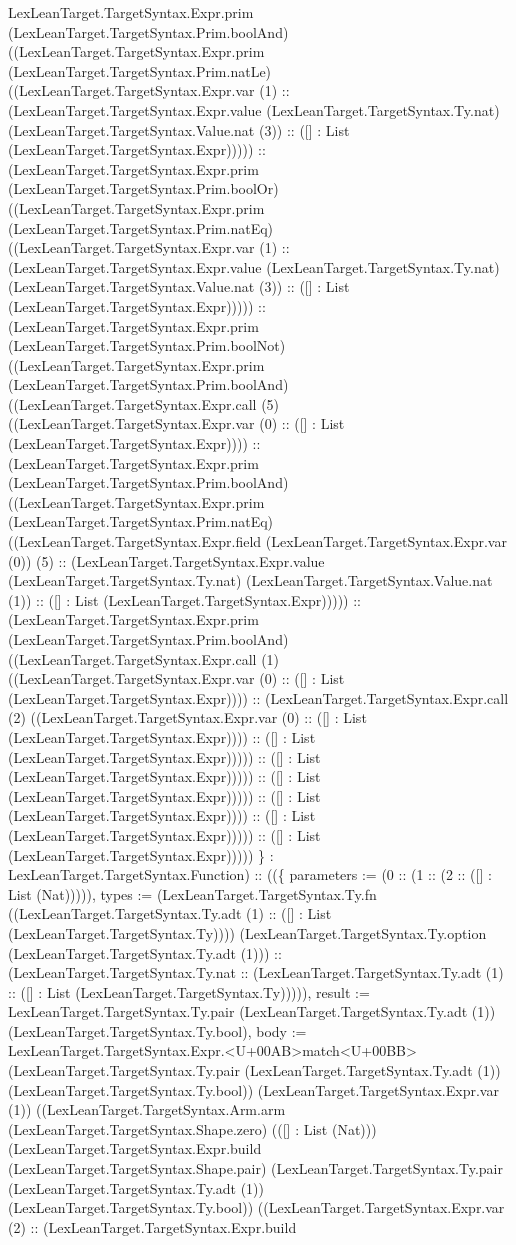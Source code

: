 \documentclass[11pt]{article}
\begin{document}
LexLeanTarget.TargetSyntax.Expr.prim (LexLeanTarget.TargetSyntax.Prim.boolAnd) ((LexLeanTarget.TargetSyntax.Expr.prim (LexLeanTarget.TargetSyntax.Prim.natLe) ((LexLeanTarget.TargetSyntax.Expr.var (1) :: (LexLeanTarget.TargetSyntax.Expr.value (LexLeanTarget.TargetSyntax.Ty.nat) (LexLeanTarget.TargetSyntax.Value.nat (3)) :: ([] : List (LexLeanTarget.TargetSyntax.Expr))))) :: (LexLeanTarget.TargetSyntax.Expr.prim (LexLeanTarget.TargetSyntax.Prim.boolOr) ((LexLeanTarget.TargetSyntax.Expr.prim (LexLeanTarget.TargetSyntax.Prim.natEq) ((LexLeanTarget.TargetSyntax.Expr.var (1) :: (LexLeanTarget.TargetSyntax.Expr.value (LexLeanTarget.TargetSyntax.Ty.nat) (LexLeanTarget.TargetSyntax.Value.nat (3)) :: ([] : List (LexLeanTarget.TargetSyntax.Expr))))) :: (LexLeanTarget.TargetSyntax.Expr.prim (LexLeanTarget.TargetSyntax.Prim.boolNot) ((LexLeanTarget.TargetSyntax.Expr.prim (LexLeanTarget.TargetSyntax.Prim.boolAnd) ((LexLeanTarget.TargetSyntax.Expr.call (5) ((LexLeanTarget.TargetSyntax.Expr.var (0) :: ([] : List (LexLeanTarget.TargetSyntax.Expr)))) :: (LexLeanTarget.TargetSyntax.Expr.prim (LexLeanTarget.TargetSyntax.Prim.boolAnd) ((LexLeanTarget.TargetSyntax.Expr.prim (LexLeanTarget.TargetSyntax.Prim.natEq) ((LexLeanTarget.TargetSyntax.Expr.field (LexLeanTarget.TargetSyntax.Expr.var (0)) (5) :: (LexLeanTarget.TargetSyntax.Expr.value (LexLeanTarget.TargetSyntax.Ty.nat) (LexLeanTarget.TargetSyntax.Value.nat (1)) :: ([] : List (LexLeanTarget.TargetSyntax.Expr))))) :: (LexLeanTarget.TargetSyntax.Expr.prim (LexLeanTarget.TargetSyntax.Prim.boolAnd) ((LexLeanTarget.TargetSyntax.Expr.call (1) ((LexLeanTarget.TargetSyntax.Expr.var (0) :: ([] : List (LexLeanTarget.TargetSyntax.Expr)))) :: (LexLeanTarget.TargetSyntax.Expr.call (2) ((LexLeanTarget.TargetSyntax.Expr.var (0) :: ([] : List (LexLeanTarget.TargetSyntax.Expr)))) :: ([] : List (LexLeanTarget.TargetSyntax.Expr))))) :: ([] : List (LexLeanTarget.TargetSyntax.Expr))))) :: ([] : List (LexLeanTarget.TargetSyntax.Expr))))) :: ([] : List (LexLeanTarget.TargetSyntax.Expr)))) :: ([] : List (LexLeanTarget.TargetSyntax.Expr))))) :: ([] : List (LexLeanTarget.TargetSyntax.Expr))))) \} : LexLeanTarget.TargetSyntax.Function) :: ((\{ parameters := (0 :: (1 :: (2 :: ([] : List (Nat))))), types := (LexLeanTarget.TargetSyntax.Ty.fn ((LexLeanTarget.TargetSyntax.Ty.adt (1) :: ([] : List (LexLeanTarget.TargetSyntax.Ty)))) (LexLeanTarget.TargetSyntax.Ty.option (LexLeanTarget.TargetSyntax.Ty.adt (1))) :: (LexLeanTarget.TargetSyntax.Ty.nat :: (LexLeanTarget.TargetSyntax.Ty.adt (1) :: ([] : List (LexLeanTarget.TargetSyntax.Ty))))), result := LexLeanTarget.TargetSyntax.Ty.pair (LexLeanTarget.TargetSyntax.Ty.adt (1)) (LexLeanTarget.TargetSyntax.Ty.bool), body := LexLeanTarget.TargetSyntax.Expr.<U+00AB>match<U+00BB> (LexLeanTarget.TargetSyntax.Ty.pair (LexLeanTarget.TargetSyntax.Ty.adt (1)) (LexLeanTarget.TargetSyntax.Ty.bool)) (LexLeanTarget.TargetSyntax.Expr.var (1)) ((LexLeanTarget.TargetSyntax.Arm.arm (LexLeanTarget.TargetSyntax.Shape.zero) (([] : List (Nat))) (LexLeanTarget.TargetSyntax.Expr.build (LexLeanTarget.TargetSyntax.Shape.pair) (LexLeanTarget.TargetSyntax.Ty.pair (LexLeanTarget.TargetSyntax.Ty.adt (1)) (LexLeanTarget.TargetSyntax.Ty.bool)) ((LexLeanTarget.TargetSyntax.Expr.var (2) :: (LexLeanTarget.TargetSyntax.Expr.build 
\end{document}
